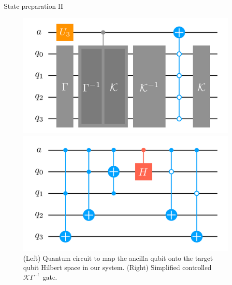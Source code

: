 \documentclass[9pt, aspectratio=169]{beamer}
\begin{document}
\begin{frame}{State preparation II}

	\begin{figure}[!p]
		\centering
		\begin{minipage}[c]{.45\linewidth}
			\centering
			\includegraphics[width=\linewidth]{Figures/NJL1-model-solving/ansatz-implementation-circuit}
		\end{minipage}
		\hspace{.025\linewidth}
		\begin{minipage}[c]{.45\linewidth}
			\centering
			\includegraphics[width=\linewidth]{Figures/NJL1-model-solving/ansatz-implementation-controlled-gammakappa}
		\end{minipage}
		\caption{(Left) Quantum circuit to map the ancilla qubit onto the target qubit Hilbert space in our system. (Right) Simplified controlled $\mathcal{K}\Gamma^{-1}$ gate.}
	\end{figure}

\end{frame}

\end{document}
